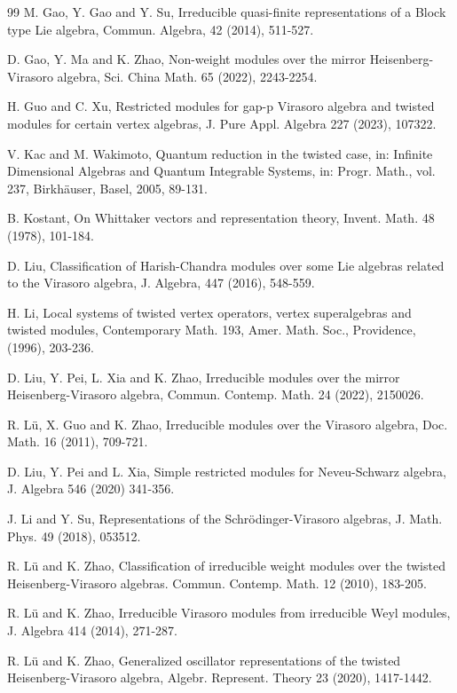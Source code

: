 \documentclass[12pt, reqno]{amsart}
\numberwithin{equation}{section}
\numberwithin{equation}{section}
\begin{document}
\begin{thebibliography}{99}
M. Gao, Y. Gao and Y. Su,
Irreducible quasi-finite representations of a Block type Lie algebra,
Commun. Algebra, 42 (2014), 511-527.


D. Gao, Y. Ma and K. Zhao,
Non-weight modules over the mirror Heisenberg-Virasoro algebra,
Sci. China Math. 65 (2022), 2243-2254.


H. Guo and C. Xu,
Restricted modules for gap-p Virasoro algebra and twisted modules for certain vertex algebras,
J. Pure Appl. Algebra 227 (2023), 107322.

V. Kac and M. Wakimoto,
Quantum reduction in the twisted case, in: Infinite Dimensional Algebras and Quantum Integrable Systems,
in: Progr. Math., vol. 237, Birkh{\" a}user, Basel, 2005,  89-131.


B. Kostant,
On Whittaker vectors and representation theory,
Invent. Math. 48 (1978), 101-184.


D. Liu,
Classification of Harish-Chandra modules over some Lie algebras related to the Virasoro algebra,
J. Algebra, 447 (2016), 548-559.

 H. Li,
{Local systems of twisted vertex
operators, vertex superalgebras and twisted modules},
Contemporary Math. 193, Amer. Math. Soc., Providence, (1996), 203-236.



D. Liu, Y. Pei, L. Xia and K. Zhao,
Irreducible modules over the mirror Heisenberg-Virasoro algebra,
Commun. Contemp. Math. 24 (2022), 2150026.


R. L{\"u}, X. Guo and K. Zhao,
Irreducible modules over the Virasoro algebra,
Doc. Math. 16 (2011), 709-721.


D. Liu, Y. Pei and L. Xia,
Simple restricted modules for Neveu-Schwarz algebra,
J. Algebra 546 (2020) 341-356.


J. Li and Y. Su,
Representations of the Schr{\" o}dinger-Virasoro algebras,
J. Math. Phys. 49 (2018), 053512.


R. L{\"u} and K. Zhao,
Classification of irreducible weight modules over the twisted Heisenberg-Virasoro algebras.
Commun. Contemp. Math. 12 (2010), 183-205.


R. L{\"u} and K. Zhao,
Irreducible Virasoro modules from irreducible Weyl modules,
J. Algebra 414 (2014), 271-287.


R. L{\"u} and K. Zhao,
Generalized oscillator representations of the twisted Heisenberg-Virasoro algebra,
Algebr. Represent. Theory 23 (2020), 1417-1442.




\end{thebibliography}
\end{document}
